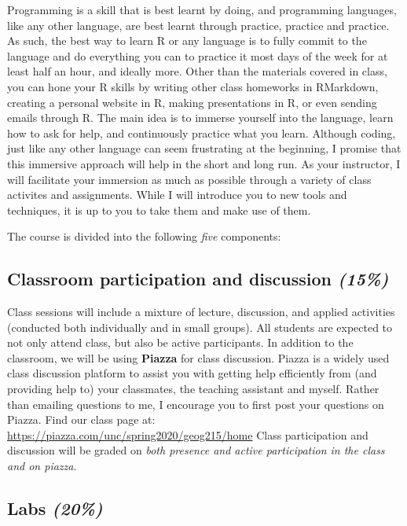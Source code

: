 \documentclass[11pt,]{article}
\begin{document}
Programming is a skill that is best learnt by doing, and programming
languages, like any other language, are best learnt through practice,
practice and practice. As such, the best way to learn R or any language
is to fully commit to the language and do everything you can to practice
it most days of the week for at least half an hour, and ideally more.
Other than the materials covered in class, you can hone your R skills by
writing other class homeworks in RMarkdown, creating a personal website
in R, making presentations in R, or even sending emails through R. The
main idea is to immerse yourself into the language, learn how to ask for
help, and continuously practice what you learn. Although coding, just
like any other language can seem frustrating at the beginning, I promise
that this immersive approach will help in the short and long run. As
your instructor, I will facilitate your immersion as much as possible
through a variety of class activites and assignments. While I will
introduce you to new tools and techniques, it is up to you to take them
and make use of them.

The course is divided into the following \emph{five} components:

\hypertarget{classroom-participation-and-discussion-15}{%
\subsection{\texorpdfstring{Classroom participation and discussion
\emph{(15\%)}}{Classroom participation and discussion (15\%)}}\label{classroom-participation-and-discussion-15}}

Class sessions will include a mixture of lecture, discussion, and
applied activities (conducted both individually and in small groups).
All students are expected to not only attend class, but also be active
participants. In addition to the classroom, we will be using
\textbf{Piazza} for class discussion. Piazza is a widely used class
discussion platform to assist you with getting help efficiently from
(and providing help to) your classmates, the teaching assistant and
myself. Rather than emailing questions to me, I encourage you to first
post your questions on Piazza. Find our class page at:
\url{https://piazza.com/unc/spring2020/geog215/home} Class participation
and discussion will be graded on \emph{both presence and active
participation in the class and on piazza}.

\hypertarget{labs-20}{%
\subsection{\texorpdfstring{Labs
\emph{(20\%)}}{Labs (20\%)}}\label{labs-20}}
\end{document}
